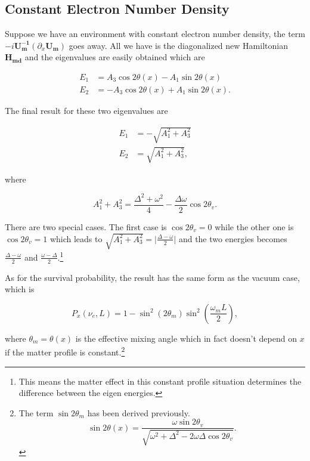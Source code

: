 \documentclass{tufte-handout}
\begin{document}
\subsection{Constant Electron Number Density}

Suppose we have an environment with constant electron number density, the term $- i \mathbf{U_m^{-1}} ( \partial_x \mathbf{U_m} )$ goes away. All we have is the diagonalized new Hamiltonian $\mathbf{H_{md}}$ and the eigenvalues are easily obtained which are

\begin{align*}
 E_1 &= A_3\cos 2\theta(x) - A_1 \sin 2\theta(x) \\ 
 E_2 & = - A_3 \cos 2\theta(x) + A_1 \sin 2\theta(x) .
\end{align*}

The final result for these two eigenvalues are

\begin{align*}
E_1 &= -\sqrt{A_1^2 + A_3^2} \\
E_2 &= \sqrt{A_1^2 + A_3^2},
\end{align*}

where

\begin{equation*}
A_1^2 + A_3^2 = \frac{\Delta^2 + \omega^2 }{4} - \frac{\Delta \omega }{2} \cos 2\theta_v.
\end{equation*}


There are two special cases. The first case is $\cos 2\theta_v=0$ while the other one is $\cos 2\theta_v = 1$ which leads to $\sqrt{A_1^2+A_3^2} = \lvert\frac{\Delta - \omega}{2} \rvert$ and the two energies becomes $\frac{\Delta - \omega}{2}$ and $\frac{\omega - \Delta}{2} $.\footnote{This means the matter effect in this constant profile situation determines the difference between the eigen energies.}


As for the survival probability, the result has the same form as the vacuum case, which is

\begin{equation*}
P_x(\nu_e,L) = 1 - \sin^2(2\theta_m)\sin^2\left( \frac{\omega_m L}{2} \right) ,
\end{equation*}



where $\theta_m = \theta(x)$ is the effective mixing angle which in fact doesn't depend on $x$ if the matter profile is constant.\footnote{The term $\sin 2\theta_m$ has been derived previously.
\begin{equation*}
\sin 2\theta(x)  = \frac{\omega\sin 2\theta_v}{\sqrt{ \omega^2+\Delta^2 - 2 \omega \Delta\cos 2\theta_v }}.
\end{equation*}
}
\end{document}
